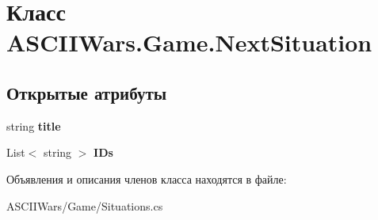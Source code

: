 \hypertarget{class_a_s_c_i_i_wars_1_1_game_1_1_next_situation}{}\section{Класс A\+S\+C\+I\+I\+Wars.\+Game.\+Next\+Situation}
\label{class_a_s_c_i_i_wars_1_1_game_1_1_next_situation}
\subsection*{Открытые атрибуты}
\begin{DoxyCompactItemize}
\item 
\hypertarget{class_a_s_c_i_i_wars_1_1_game_1_1_next_situation_a5d21d7465e8bb363277591d61759ba1d}{}\label{class_a_s_c_i_i_wars_1_1_game_1_1_next_situation_a5d21d7465e8bb363277591d61759ba1d} 
string {\bfseries title}
\item 
\hypertarget{class_a_s_c_i_i_wars_1_1_game_1_1_next_situation_a882f10c3c66963ef3e67c9e30689c968}{}\label{class_a_s_c_i_i_wars_1_1_game_1_1_next_situation_a882f10c3c66963ef3e67c9e30689c968} 
List$<$ string $>$ {\bfseries I\+Ds}
\end{DoxyCompactItemize}


Объявления и описания членов класса находятся в файле\+:\begin{DoxyCompactItemize}
\item 
A\+S\+C\+I\+I\+Wars/\+Game/Situations.\+cs\end{DoxyCompactItemize}
